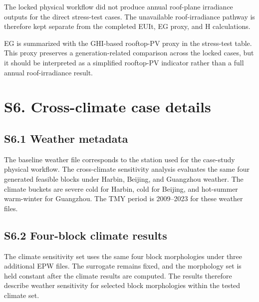 \documentclass[11pt]{article}
\begin{document}
The locked physical workflow did not produce annual roof-plane irradiance outputs for the direct stress-test cases. The unavailable roof-irradiance pathway is therefore kept separate from the completed EUIt, EG proxy, and H calculations.

EG is summarized with the GHI-based rooftop-PV proxy in the stress-test table. This proxy preserves a generation-related comparison across the locked cases, but it should be interpreted as a simplified rooftop-PV indicator rather than a full annual roof-irradiance result.

\section*{S6. Cross-climate case details}

\subsection*{S6.1 Weather metadata}

The baseline weather file corresponds to the station used for the case-study physical workflow. The cross-climate sensitivity analysis evaluates the same four generated feasible blocks under Harbin, Beijing, and Guangzhou weather. The climate buckets are severe cold for Harbin, cold for Beijing, and hot-summer warm-winter for Guangzhou. The TMY period is 2009--2023 for these weather files.

\subsection*{S6.2 Four-block climate results}

The climate sensitivity set uses the same four block morphologies under three additional EPW files. The surrogate remains fixed, and the morphology set is held constant after the climate results are computed. The results therefore describe weather sensitivity for selected block morphologies within the tested climate set.
\end{document}
